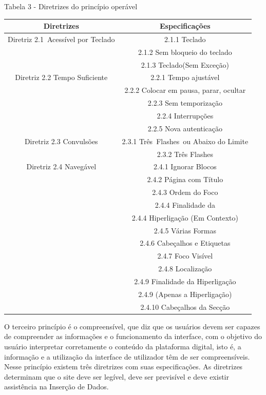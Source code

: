 \documentclass[a4paper]{article}
\begin{document}
\begin{titlepage}
Tabela 3 - Diretrizes do princípio operável\\
\begin{center}
	\fontsize{8pt}{8pt}\selectfont
	\begin{tabular}{|cc|}
		\hline
		Diretrizes & Especificações \\
		\hline
		Diretriz 2.1 Acessível por Teclado& 2.1.1 Teclado\\
		& 2.1.2 Sem bloqueio do teclado\\
		& 2.1.3 Teclado(Sem Exceção)\\
		\hline
		Diretriz 2.2 Tempo Suficiente & 2.2.1 Tempo ajustável \\
		& 2.2.2 Colocar em pausa, parar, ocultar\\
		& 2.2.3 Sem temporização\\
		& 2.2.4 Interrupções\\
		& 2.2.5 Nova autenticação\\
		\hline
		Diretriz 2.3 Convulsões& 2.3.1 Três Flashes ou Abaixo do Limite\\
		& 2.3.2 Três Flashes\\
		\hline
		Diretriz 2.4 Navegável& 2.4.1 Ignorar Blocos\\
		& 2.4.2 Página com Título\\
		& 2.4.3 Ordem do Foco\\
		& 2.4.4 Finalidade da\\
		& 2.4.4 Hiperligação (Em Contexto)\\
		& 2.4.5 Várias Formas\\
		& 2.4.6 Cabeçalhos e Etiquetas\\
		& 2.4.7 Foco Visível\\
		& 2.4.8 Localização\\
		& 2.4.9 Finalidade da Hiperligação\\
		& 2.4.9 (Apenas a Hiperligação)\\
		& 2.4.10 Cabeçalhos da Secção\\
		\hline
	\end{tabular}
\end{center}

O terceiro princípio é o compreensível, que diz que os usuários devem ser capazes de compreender as informações e o funcionamento da interface, com o objetivo do usuário interpretar corretamente o conteúdo da plataforma digital, isto é, a informação e a utilização da interface de utilizador têm de ser compreensíveis. Nesse princípio existem três diretrizes com suas especificações. As diretrizes determinam que o site deve ser legível, deve ser previsível e deve existir assistência na Inserção de Dados.


\end{titlepage}
\end{document}
